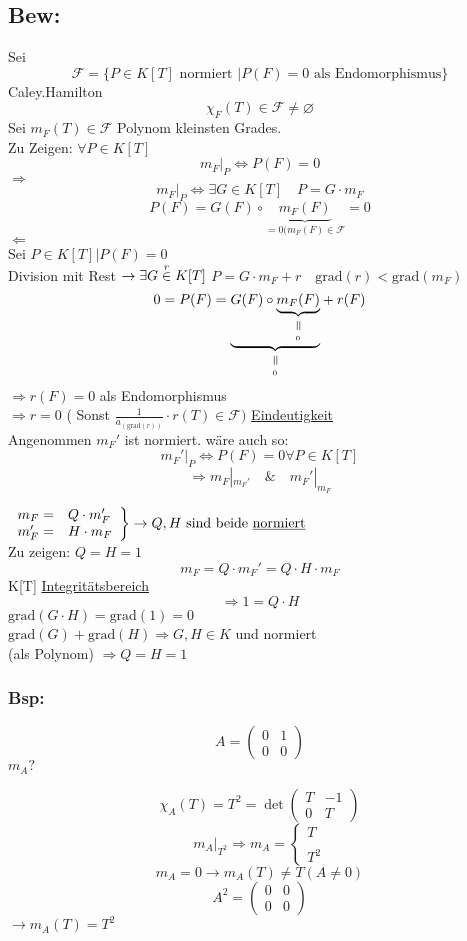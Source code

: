 \documentclass[titlepage,12pt,a4paper,ngerman]{report}
\newcommand{\verteq}{\rotatebox{90}{$\,=$}}
\newcommand{\equalto}[2]{\underset{\scriptstyle\overset{\mkern4mu\verteq}{#2}}{#1}}
\newcommand{\tx}[1]{\textrm{#1}}
\newcommand{\ub}[1]{\underbrace{#1}}
\newcommand{\grad}{\tx{grad}}
\begin{document}
\subsection{Bew:} Sei $$\mathcal{F} = \{ P\in K[T] \tx{ normiert } |P(F) = 0 \tx{ als Endomorphismus}\}$$
Caley.Hamilton
$$\chi_F(T) \in \mathcal{F} \neq \varnothing$$
Sei $m_F(T) \in \mathcal{F}$ Polynom kleinsten Grades.\\
Zu Zeigen: $\forall P\in K[T]$
$$m_F|_P \Leftrightarrow P(F) = 0$$
$\Rightarrow$\\
$$m_F|_P \Leftrightarrow \exists G \in K[T] \quad P = G \cdot m_F$$
$$ P(F) = G(F) \circ \ub{m_F(F)}_{= 0 (m_F(F) \in \mathcal{F}} = 0$$
$\Leftarrow$\\
Sei $P \in K[T] | P(F) = 0$\\
Division mit Rest $\rightarrow \exists G \buildrel r \over \in K[T]$
$ P = G \cdot m_F + r \quad \grad(r) < \grad(m_F)$
$$0=P(F) = \equalto{\ub{G(F) \circ \equalto{\ub{m_F(F)}}{_{0}}}}{_{ 0}} + r(F)$$
$\Rightarrow r(F) = 0$ als Endomorphismus\\
$ \Rightarrow r = 0$ ( Sonst $\frac{1}{a_{(\grad(r))}} \cdot r(T) \in \mathcal{F})$
\underline{Eindeutigkeit}\\
Angenommen $m_F'$ ist normiert. wäre auch so:
$$m_F'|_P \Leftrightarrow P(F) = 0 \forall P \in K[T]$$
$$\Rightarrow m_F|_{m_F'} \quad \& \quad m_F'|_{m_F}$$ 

$\left. \begin{array}{ll}
m_F = & Q \cdot m_F' \\
m_F' = & H \cdot m_F
\end{array} \right\} \rightarrow Q,H \tx{ sind beide \underline{normiert}} $\\[10pt]
Zu zeigen: \underline{$Q=H=1$}
$$m_F = Q \cdot m_F' = Q \cdot H \cdot m_F$$
K[T] \underline{Integritätsbereich}
$$ \Rightarrow 1 = Q \cdot H$$
$\grad(G\cdot H) = \grad (1) = 0$\\
$\grad(G) + \grad(H) \Rightarrow G,H \in K $ und normiert\\
(als Polynom) $\Rightarrow Q = H = 1$

\subsubsection{Bsp:}
$$A = \begin{pmatrix}
0 & 1 \\
0 & 0
\end{pmatrix}$$
$m_A? $

$$\chi_A(T) = T^2 = \det\begin{pmatrix}
T & -1 \\
0 & T
\end{pmatrix}$$
$$m_A|_{T^2} \Rightarrow m_A = \left\{ \begin{array}{ll}
T \\ \\ T^2
\end{array} \right.$$
$$m_A = 0 \rightarrow m_A(T) \neq T (A\neq 0)$$
$$A^2 = \begin{pmatrix}
0 & 0\\
0 & 0
\end{pmatrix}$$
$\rightarrow m_A(T) = T^2$
\end{document}
